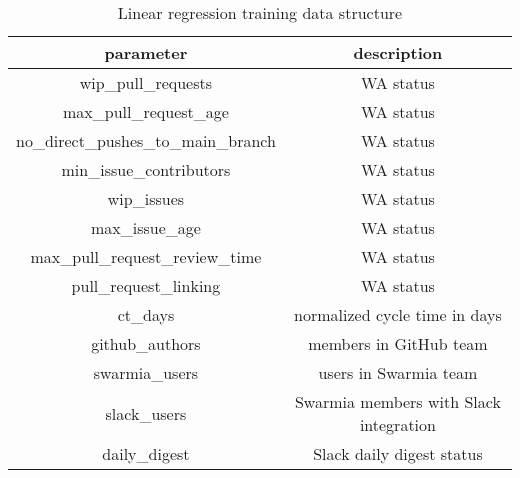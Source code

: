 \begin{table}[h!]
\begin{center}
\begin{tabular}{ |c|c| } 
\hline
parameter & description \\ [0.5ex] 
\hline\hline
wip\_pull\_requests & WA status \\
max\_pull\_request\_age & WA status \\
no\_direct\_pushes\_to\_main\_branch & WA status \\
min\_issue\_contributors  & WA status \\
wip\_issues & WA status \\
max\_issue\_age  & WA status \\
max\_pull\_request\_review\_time  & WA status \\
pull\_request\_linking  & WA status \\
ct\_days  & normalized cycle time in days \\
github\_authors & members in GitHub team \\
swarmia\_users & users in Swarmia team \\
slack\_users & Swarmia members with Slack integration \\
daily\_digest & Slack daily digest status \\
\hline
\end{tabular}
\caption{Linear regression training data structure}
\label{table:trainingDataStructure}
\end{center}
\end{table}